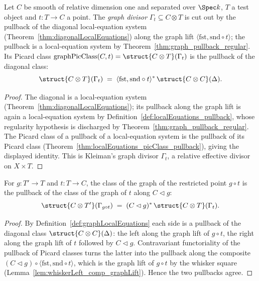 \begin{definition}
  \label{def:graphLocalEquations}
  \leanok
  Let \(C\) be smooth of relative dimension one and separated over \(\Spec k\), \(T\) a test object
  and \(t \colon T \to C\) a point. The \emph{graph divisor} \(\Gamma_t \subseteq C \otimes T\) is
  cut out by the pullback of the diagonal local-equation system
  (Theorem~\ref{thm:diagonalLocalEquations}) along the graph lift \(\langle \mathrm{fst},
  \mathrm{snd} \circ t\rangle\); the pullback is a local-equation system by
  Theorem~\ref{thm:graph_pullback_regular}. Its Picard class \(\mathrm{graphPicClass}(C, t) =
  \struct{C \otimes T}(\Gamma_t)\) is the pullback of the diagonal class:
  \[
    \struct{C \otimes T}(\Gamma_t)
      \;=\; \langle \mathrm{fst}, \mathrm{snd} \circ t\rangle^{*}\,\struct{C \otimes C}(\Delta).
  \]
\end{definition}
\begin{proof}
  \leanok
  The diagonal is a local-equation system (Theorem~\ref{thm:diagonalLocalEquations}); its pullback
  along the graph lift is again a local-equation system by
  Definition~\ref{def:localEquations_pullback}, whose regularity hypothesis is discharged by
  Theorem~\ref{thm:graph_pullback_regular}. The Picard class of a pullback of a local-equation
  system is the pullback of its Picard class (Theorem~\ref{thm:localEquations_picClass_pullback}),
  giving the displayed identity. This is Kleiman's graph divisor \(\Gamma_t\), a relative effective
  divisor on \(X \times T\).
\end{proof}

\begin{theorem}
  \label{thm:graphLocalEquations_base_change}
  \leanok
  For \(g \colon T' \to T\) and \(t \colon T \to C\), the class of the graph of the restricted
  point \(g \circ t\) is the pullback of the class of the graph of \(t\) along \(C \lhd g\):
  \[
    \struct{C \otimes T'}(\Gamma_{g \circ t})
      \;=\; (C \lhd g)^{*}\,\struct{C \otimes T}(\Gamma_t).
  \]
\end{theorem}
\begin{proof}
  \leanok
  By Definition~\ref{def:graphLocalEquations} each side is a pullback of the diagonal class
  \(\struct{C \otimes C}(\Delta)\): the left along the graph lift of \(g \circ t\), the right along
  the graph lift of \(t\) followed by \(C \lhd g\). Contravariant functoriality of the pullback of
  Picard classes turns the latter into the pullback along the composite \((C \lhd g) \circ
  \langle\mathrm{fst}, \mathrm{snd} \circ t\rangle\), which is the graph lift of \(g \circ t\) by
  the whisker square (Lemma~\ref{lem:whiskerLeft_comp_graphLift}). Hence the two pullbacks agree.
\end{proof}


